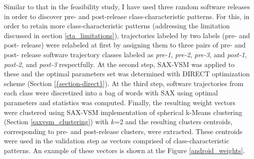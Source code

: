 Similar to that in the feasibility study, I have used three random software releases in order to discover pre- and post-release class-characteristic patterns. For this, in order to retain more class-characteristic patterns (addressing the limitation discussed in section \ref{sta_limitations}), trajectories labeled by two labels (pre- and post- release) were relabeled at first by assigning them to three pairs of  pre- and post- release software trajectory classes labeled as \textit{pre-1}, \textit{pre-2}, \textit{pre-3}, and \textit{post-1}, \textit{post-2}, and \textit{post-3} respectfully. At the second step, SAX-VSM was applied to these and the optimal parameters set was determined with DIRECT optimization scheme (Section \ref{{section-direct}}). At the third step, software trajectories from each class were discretized into a bag of words with SAX using optimal parameters and \tfidf statistics was computed. Finally, the resulting weight vectors were clustered using SAX-VSM implementation of spherical k-Means clustering (Section \ref{saxvsm_clustering}) with $k$=2 and the resulting clusters centroids, corresponding to pre- and post-release clusters, were extracted. These centroids were used in the validation step as vectors comprised of class-characteristic patterns. An example of these vectors is shown at the Figure \ref{android_weights}.

